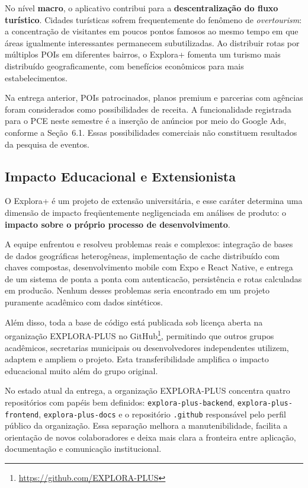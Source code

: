 \documentclass[12pt, a4paper]{article}
\begin{document}
No n\'ivel \textbf{macro}, o aplicativo contribui para a \textbf{descentraliza\c{c}\~ao do fluxo tur\'istico}. Cidades tur\'isticas sofrem frequentemente do fen\^omeno de \textit{overtourism}: a concentra\c{c}\~ao de visitantes em poucos pontos famosos ao mesmo tempo em que \'areas igualmente interessantes permanecem subutilizadas. Ao distribuir rotas por m\'ultiplos POIs em diferentes bairros, o Explora+ fomenta um turismo mais distribu\'ido geograficamente, com benef\'icios econ\^omicos para mais estabelecimentos.

Na entrega anterior, POIs patrocinados, planos premium e parcerias com agências foram considerados como possibilidades de receita. A funcionalidade registrada para o PCE neste semestre é a inserção de anúncios por meio do Google Ads, conforme a Seção~6.1. Essas possibilidades comerciais não constituem resultados da pesquisa de eventos.

\subsection{Impacto Educacional e Extensionista}

O Explora+ \'e um projeto de extens\~ao universit\'aria, e esse car\'ater determina uma dimens\~ao de impacto freq\"uentemente negligenciada em an\'alises de produto: o \textbf{impacto sobre o pr\'oprio processo de desenvolvimento}.

A equipe enfrentou e resolveu problemas reais e complexos: integra\c{c}\~ao de bases de dados geogr\'aficas heterog\^eneas, implementa\c{c}\~ao de cache distribu\'ido com chaves compostas, desenvolvimento mobile com Expo e React Native, e entrega de um sistema de ponta a ponta com autenticac\~ao, persist\^encia e rotas calculadas em produc\~ao. Nenhum desses problemas seria encontrado em um projeto puramente acad\^emico com dados sint\'eticos.

Al\'em disso, toda a base de c\'odigo est\'a publicada sob licen\c{c}a aberta na organiza\c{c}\~ao EXPLORA-PLUS no GitHub\footnote{\url{https://github.com/EXPLORA-PLUS}}, permitindo que outros grupos acad\^emicos, secretarias municipais ou desenvolvedores independentes utilizem, adaptem e ampliem o projeto. Esta transferibilidade amplifica o impacto educacional muito al\'em do grupo original.

No estado atual da entrega, a organiza\c{c}\~ao EXPLORA-PLUS concentra quatro reposit\'orios com pap\'eis bem definidos: \texttt{explora-plus-backend}, \texttt{explora-plus-frontend}, \texttt{explora-plus-docs} e o reposit\'orio \texttt{.github} respons\'avel pelo perfil p\'ublico da organiza\c{c}\~ao. Essa separa\c{c}\~ao melhora a manutenibilidade, facilita a orienta\c{c}\~ao de novos colaboradores e deixa mais clara a fronteira entre aplica\c{c}\~ao, documenta\c{c}\~ao e comunica\c{c}\~ao institucional.
\end{document}
